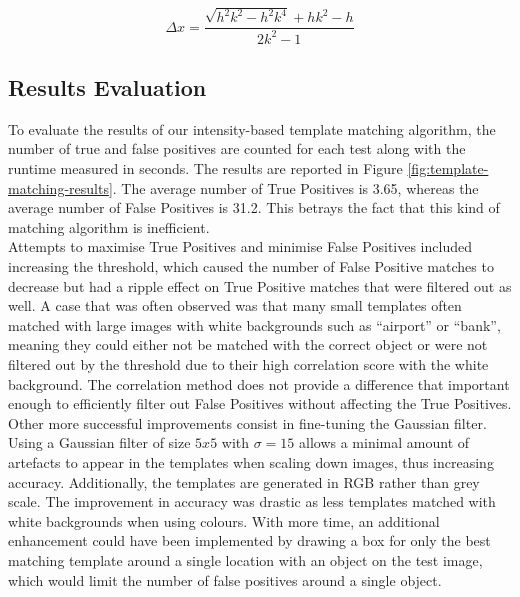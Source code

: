 \documentclass[a4paper,11pt,twocolumn]{article}
\begin{document}
\begin{equation}\label{eq:a}
    \Delta x=\frac{\sqrt{h^2k^2-h^2k^4}+hk^2-h}{2k^2-1}
\end{equation}

\subsection{Results Evaluation}

To evaluate the results of our intensity-based template matching algorithm, the number of true and false positives are counted for each test along with the runtime measured in seconds. The results are reported in Figure \ref{fig:template-matching-results}. The average number of True Positives is 3.65, whereas the average number of False Positives is 31.2. This betrays the fact that this kind of matching algorithm is inefficient.\\

Attempts to maximise True Positives and minimise False Positives included increasing the threshold, which caused the number of False Positive matches to decrease but had a ripple effect on True Positive matches that were filtered out as well. A case that was often observed was that many small templates often matched with large images with white backgrounds such as ``airport'' or ``bank'', meaning they could either not be matched with the correct object or were not filtered out by the threshold due to their high correlation score with the white background. The correlation method does not provide a difference that important enough to efficiently filter out False Positives without affecting the True Positives.\\

Other more successful improvements consist in fine-tuning the Gaussian filter. Using a Gaussian filter of size $5x5$ with $\sigma=15$ allows a minimal amount of artefacts to appear in the templates when scaling down images, thus increasing accuracy. Additionally, the templates are generated in RGB rather than grey scale. The improvement in accuracy was drastic as less templates matched with white backgrounds when using colours. With more time, an additional enhancement could have been implemented by drawing a box for only the best matching template around a single location with an object on the test image, which would limit the number of false positives around a single object.
\end{document}
